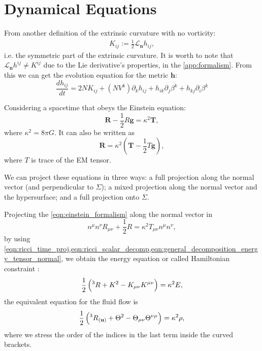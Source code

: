 \section{Dynamical Equations}


From another definition of the extrinsic curvature with no vorticity:
\begin{align}
    K_{ij} := \frac{1}{2} \mathcal{L}_{\mathbf{n}} h_{ij},
\end{align}
i.e. the symmetric part of the extrinsic curvature. It is worth to note that $\mathcal{L}_{\mathbf{n}} h^{ij} \neq K^{ij}$ due to the Lie derivative's properties, in the \cref{app:formalism}. 
From this we can get the evolution equation for the metric $\mathbf{h}$:
\begin{equation}
    \frac{d h_{ij}}{dt} = 2NK_{ij}+(NV^k) \partial_k h_{ij} + h_{ik}\partial_j \beta^k + h_{kj}\partial_i \beta^k
\end{equation}


Considering a spacetime that obeys the Einstein equation:
\begin{equation}
    \mathbf{R}-\frac{1}{2}R\mathbf{g}=\kappa^2 \mathbf{T},
    \label{eqn:einstein_formalism}
\end{equation}
where $\kappa^2=8\pi G$. It can also be written as
\begin{equation}
    \mathbf{R}=\kappa^2 \left(\mathbf{T}-\frac{1}{2}T\mathbf{g}\right),
    \label{eqn:einstein_equiv}
\end{equation}
where $T$ is trace of the EM tensor.

We can project these equations in three ways: a full projection along the normal vector (and perpendicular to $\Sigma$); a mixed projection along the normal vector and the hypersurface; and a full projection onto $\Sigma$.

Projecting the \cref{eqn:einstein_formalism} along the normal vector in
\begin{equation}
    n^\mu n^\nu R_{\mu\nu}+\frac{1}{2}R=\kappa^2 T_{\mu\nu}n^\mu n^\nu,
\end{equation}
by using \cref{eqn:ricci_time_proj,eqn:ricci_scalar_decomp,eqn:general_decomposition_energy_tensor_normal}, we obtain the energy equation or called Hamiltonian constraint \cite{Gourgoulhon:2012ffd}:
\begin{equation}
    \frac{1}{2}\left(\prescript{3}{}R+K^2-K_{\mu\nu}K^{\mu\nu}\right)=\kappa^2 E,
    \label{eqn:energy_equation_normal}
\end{equation}
the equivalent equation for the fluid flow is
\begin{equation}
    \frac{1}{2}\left(\prescript{3}{}R_{(\mathbf{u})}+\Theta^2-\Theta_{\mu\nu}\Theta^{\nu\mu}\right)=\kappa^2\rho,
\end{equation}
where we stress the order of the indices in the last term inside the curved brackets.

